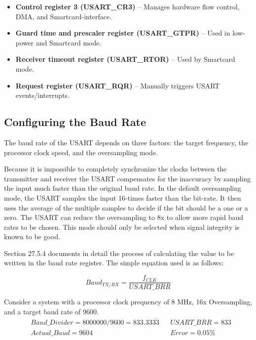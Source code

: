 \documentclass[11pt,fleqn]{book} %
\begin{document}
\begin{itemize}
    \item \textbf{Control register 3 (USART\_CR3)} -- Manages hardware flow control, DMA, and Smartcard-interface. 
    \item \textbf{Guard time and prescaler register (USART\_GTPR)} -- Used in low-power and Smartcard mode. 
    \item \textbf{Receiver timeout register (USART\_RTOR)} -- Used by Smartcard mode. 
    \item \textbf{Request register (USART\_RQR)} -- Manually triggers USART events/interrupts. 
\end{itemize}

\subsection{Configuring the Baud Rate}	
The baud rate of the USART depends on three factors: the target frequency, the processor clock speed, and the oversampling mode.

Because it is impossible to completely synchronize the clocks between the transmitter and receiver the USART compensates for the inaccuracy by sampling the input much faster than the original baud rate. In the default oversampling mode, the USART samples the input 16-times faster than the bit-rate. It then uses the average of the multiple samples to decide if the bit should be a one or a zero. The USART can reduce the oversampling to 8x to allow more rapid baud rates to be chosen. This mode should only be selected when signal integrity is known to be good.

Section 27.5.4 documents in detail the process of calculating the value to be written in the baud rate register. The simple equation used is as follows:

\begin{equation*}
Baud_{TX/RX} = \frac{f_{CLK}}{USART\_BRR}
\end{equation*}



\begin{example}
    Consider a system with a processor clock prequency of 8 MHz, 16x Oversampling, and a target baud rate of 9600.  
    \begin{align*}
    & Baud\_Divider = 8000000/9600 = 833.33\overline{33} & & USART\_BRR = 833\\[0.25em]
    & Actual\_Baud = 9604 & & Error = 0.05 \%
    \end{align*}
    
\end{example}
    
\end{document}
